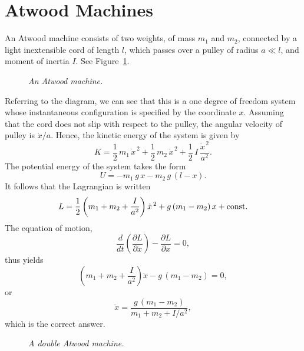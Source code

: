 \section{Atwood Machines}
An Atwood machine consists of two weights, of mass $m_1$ and $m_2$, 
connected by a light inextensible cord of length $l$, which passes over
a pulley of radius $a\ll l$, and moment of inertia $I$. See Figure~\ref{att}.

\begin{figure}
\epsfysize=3in
\centerline{}
\caption{\em An Atwood machine.}\label{att}
\end{figure}

Referring to the diagram, we can see that this is a one degree of freedom
system whose instantaneous configuration is specified by the coordinate $x$.
Assuming that the cord does not slip with respect to the pulley, the
angular velocity of pulley is $\dot{x}/a$. Hence, the kinetic
energy of the system is given by
\begin{equation}
K = \frac{1}{2}\,m_1\,\dot{x}^{\,2} + \frac{1}{2}\,m_2\,\dot{x}^{\,2}
+ \frac{1}{2}\,I\, \frac {\dot{x}^{\,2}}{a^2}.
\end{equation}
The potential energy of the system takes the form
\begin{equation}
U = -m_1\,g\,x - m_2\,g\,(l-x).
\end{equation}
It follows that the Lagrangian is written
\begin{equation}
L=\frac{1}{2}\left(m_1+ m_2+\frac{I}{a^2}\right)\dot{x}^{\,2} + g\,(m_1-m_2)\,x + {\rm const}.
\end{equation}
The equation of motion,
\begin{equation}
\frac{d}{dt}\!\left(\frac{\partial L}{\partial\dot{x}}\right) - \frac{\partial L}{\partial x} = 0,
\end{equation}
thus yields
\begin{equation}
\left(m_1+ m_2+\frac{I}{a^2}\right)\ddot{x} - g\,(m_1-m_2) = 0,
\end{equation}
or
\begin{equation}
\ddot{x} = \frac{g\,(m_1-m_2)}{m_1+m_2 + I/a^2},
\end{equation}
which is the correct answer.

\begin{figure}
\epsfysize=3.25in
\centerline{}
\caption{\em A double Atwood machine.}\label{att1}
\end{figure}

